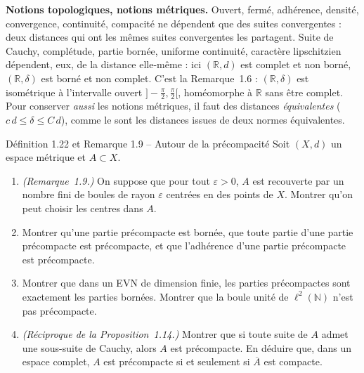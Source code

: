 \documentclass[11pt,a4paper]{article}
\newcommand{\R}{\mathbb{R}}
\newcommand{\N}{\mathbb{N}}
\newcommand{\adh}[1]{\overline{#1}}
\theoremstyle{definition}
\begin{document}
\begin{pointcle}
\textbf{Notions topologiques, notions métriques.} Ouvert, fermé, adhérence, densité, convergence, continuité, compacité ne dépendent que des suites convergentes : deux distances qui ont les mêmes suites convergentes les partagent. Suite de Cauchy, complétude, partie bornée, uniforme continuité, caractère lipschitzien dépendent, eux, de la distance elle-même : ici $(\R,d)$ est complet et non borné, $(\R,\delta)$ est borné et non complet. C'est la Remarque~1.6 : $(\R,\delta)$ est isométrique à l'intervalle ouvert $]-\frac\pi2,\frac\pi2[$, homéomorphe à $\R$ sans être complet. Pour conserver \emph{aussi} les notions métriques, il faut des distances \emph{équivalentes} ($c\,d\le\delta\le C\,d$), comme le sont les distances issues de deux normes équivalentes.
\end{pointcle}

\begin{exo}{Définition 1.22 et Remarque 1.9 -- Autour de la précompacité}
Soit $(X,d)$ un espace métrique et $A\subset X$.
\begin{enumerate}[label=(\alph*)]
  \item \emph{(Remarque~1.9.)} On suppose que pour tout $\varepsilon>0$, $A$ est recouverte par un nombre fini de boules de rayon $\varepsilon$ centrées en des points de $X$. Montrer qu'on peut choisir les centres dans $A$.
  \item Montrer qu'une partie précompacte est bornée, que toute partie d'une partie précompacte est précompacte, et que l'adhérence d'une partie précompacte est précompacte.
  \item Montrer que dans un EVN de dimension finie, les parties précompactes sont exactement les parties bornées. Montrer que la boule unité de $\ell^2(\N)$ n'est pas précompacte.
  \item \emph{(Réciproque de la Proposition~1.14.)} Montrer que si toute suite de $A$ admet une sous-suite de Cauchy, alors $A$ est précompacte. En déduire que, dans un espace complet, $A$ est précompacte si et seulement si $\adh A$ est compacte.
\end{enumerate}
\end{exo}
\end{document}
